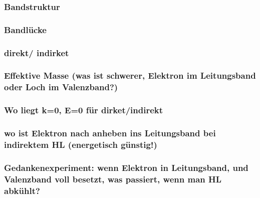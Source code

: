 	\subsubsection{Bandstruktur}
	\subsubsection{Bandlücke}
	\subsubsection{direkt/ indirket}
	\subsubsection{Effektive Masse (was ist schwerer, Elektron im Leitungsband oder Loch im Valenzband?)}
	\subsubsection{Wo liegt k=0, E=0 für dirket/indirekt}
	\subsubsection{wo ist Elektron nach anheben ins Leitungsband bei indirektem HL (energetisch günstig!)}
	\subsubsection{Gedankenexperiment: wenn Elektron in Leitungsband, und Valenzband voll besetzt, was passiert, wenn man HL abkühlt?}